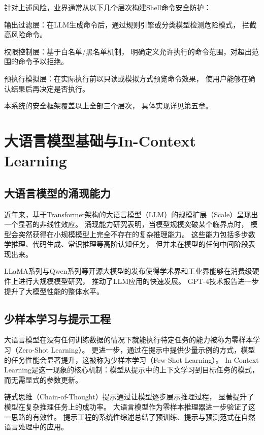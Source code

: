 针对上述风险，业界通常从以下几个层次构建Shell命令安全防护：

输出过滤层：在LLM生成命令后，通过规则引擎或分类模型检测危险模式，
拦截高风险命令。

权限控制层：基于白名单/黑名单机制，
明确定义允许执行的命令范围，对超出范围的命令予以拒绝。

预执行模拟层：在实际执行前以只读或模拟方式预览命令效果，
使用户能够在确认结果后再决定是否执行。

本系统的安全框架覆盖以上全部三个层次，
具体实现详见第五章。

\section{大语言模型基础与In-Context Learning}

\subsection{大语言模型的涌现能力}

近年来，基于Transformer架构的大语言模型（LLM）的规模扩展（Scale）呈现出一个显著的非线性效应。
涌现能力研究表明，当模型规模突破某个临界点时，
模型会突然获得在小规模模型上完全不存在的复杂推理能力。
这些能力包括多步数学推理、代码生成、常识推理等高阶认知任务，
但并未在模型的任何中间阶段表现出来。

LLaMA系列与Qwen系列等开源大模型的发布使得学术界和工业界能够在消费级硬件上进行大规模模型研究，
推动了LLM应用的快速发展。
GPT-4技术报告进一步提升了大模型性能的整体水平。

\subsection{少样本学习与提示工程}

大语言模型在没有任何训练数据的情况下就能执行特定任务的能力被称为零样本学习（Zero-Shot Learning）。
更进一步，通过在提示中提供少量示例的方式，模型的任务性能会显著提升，这被称为少样本学习（Few-Shot Learning）。
In-Context Learning是这一现象的核心机制：模型从提示中的上下文学习到目标任务的模式，
而无需显式的参数更新。

链式思维（Chain-of-Thought）提示通过让模型逐步展示推理过程，
显著提升了模型在复杂推理任务上的成功率。
大语言模型作为零样本推理器进一步验证了这一思路的有效性。
提示工程的系统性综述总结了预训练、提示与预测范式在自然语言处理中的应用。

